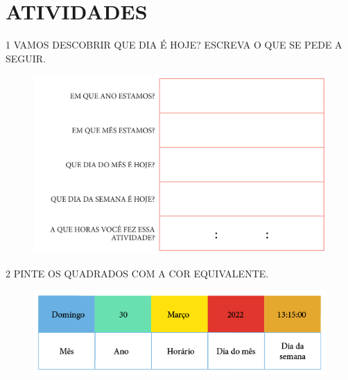 \pagebreak
\section{ATIVIDADES}

\num{1} VAMOS DESCOBRIR QUE DIA É HOJE? ESCREVA O QUE SE PEDE A SEGUIR.

%
%
%
%

\begin{figure}[htpb!]
\centering
\includegraphics[width=\textwidth]{./media/SAEB_1ANO_MAT_FIGURA48.png}
\end{figure}


\num{2} PINTE OS QUADRADOS COM A COR EQUIVALENTE.

\begin{figure}[htpb!]
\centering
\includegraphics[width=\textwidth]{./media/SAEB_1ANO_MAT_FIGURA49.png}
\end{figure}

